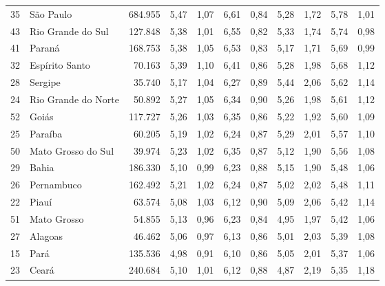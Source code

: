 \begin{table}[]
{\begin{tabular}{llrrrrrrrrr}
            35 & São Paulo           & 684.955 & 5,47 & 1,07 & 6,61 & 0,84 & 5,28 & 1,72 & 5,78 & 1,01 \\
            \rowcolor[HTML]{DCE6F1}
            43 & Rio Grande do Sul   & 127.848 & 5,38 & 1,01 & 6,55 & 0,82 & 5,33 & 1,74 & 5,74 & 0,98 \\
            41 & Paraná              & 168.753 & 5,38 & 1,05 & 6,53 & 0,83 & 5,17 & 1,71 & 5,69 & 0,99 \\
            \rowcolor[HTML]{DCE6F1}
            32 & Espírito Santo      & 70.163  & 5,39 & 1,10 & 6,41 & 0,86 & 5,28 & 1,98 & 5,68 & 1,12 \\
            28 & Sergipe             & 35.740  & 5,17 & 1,04 & 6,27 & 0,89 & 5,44 & 2,06 & 5,62 & 1,14 \\
            \rowcolor[HTML]{DCE6F1}
            24 & Rio Grande do Norte & 50.892  & 5,27 & 1,05 & 6,34 & 0,90 & 5,26 & 1,98 & 5,61 & 1,12 \\
            52 & Goiás               & 117.727 & 5,26 & 1,03 & 6,35 & 0,86 & 5,22 & 1,92 & 5,60 & 1,09 \\
            \rowcolor[HTML]{DCE6F1}
            25 & Paraíba             & 60.205  & 5,19 & 1,02 & 6,24 & 0,87 & 5,29 & 2,01 & 5,57 & 1,10 \\
            50 & Mato Grosso do Sul  & 39.974  & 5,23 & 1,02 & 6,35 & 0,87 & 5,12 & 1,90 & 5,56 & 1,08 \\
            \rowcolor[HTML]{DCE6F1}
            29 & Bahia               & 186.330 & 5,10 & 0,99 & 6,23 & 0,88 & 5,15 & 1,90 & 5,48 & 1,06 \\
            26 & Pernambuco          & 162.492 & 5,21 & 1,02 & 6,24 & 0,87 & 5,02 & 2,02 & 5,48 & 1,11 \\
            \rowcolor[HTML]{DCE6F1}
            22 & Piauí               & 63.574  & 5,08 & 1,03 & 6,12 & 0,90 & 5,09 & 2,06 & 5,42 & 1,14 \\
            51 & Mato Grosso         & 54.855  & 5,13 & 0,96 & 6,23 & 0,84 & 4,95 & 1,97 & 5,42 & 1,06 \\
            \rowcolor[HTML]{DCE6F1}
            27 & Alagoas             & 46.462  & 5,06 & 0,97 & 6,13 & 0,86 & 5,01 & 2,03 & 5,39 & 1,08 \\
            15 & Pará                & 135.536 & 4,98 & 0,91 & 6,10 & 0,86 & 5,05 & 2,01 & 5,37 & 1,06 \\
            \rowcolor[HTML]{DCE6F1}
            23 & Ceará               & 240.684 & 5,10 & 1,01 & 6,12 & 0,88 & 4,87 & 2,19 & 5,35 & 1,18 \\

\end{tabular}}
\end{table}
